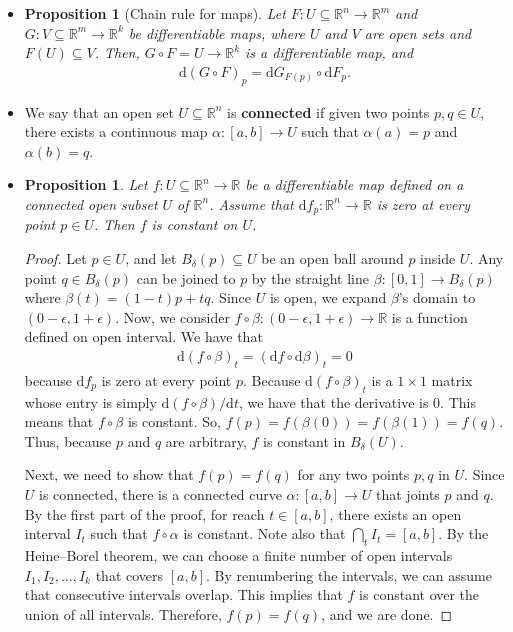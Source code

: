 \documentclass[10pt]{article}
\newtheorem{proposition}[lemma]{Proposition}
\newcommand{\dee}{\mathrm{d}}
\newcommand{\ra}{\rightarrow}
\newcommand{\Real}{\mathbb{R}}
\newcommand{\sseq}{\subseteq}
\begin{document}
\begin{itemize}
    \item \begin{proposition}[Chain rule for maps]
      Let $F: U \sseq \Real^n \ra \Real^m$ and $G : V \sseq \Real^m \ra \Real^k$ be differentiable maps, where $U$ and $V$ are open sets and $F(U) \sseq V$. Then, $G \circ F = U \ra \Real^k$ is a differentiable map, and
      \begin{align*}
        \dee (G \circ F)_p = \dee G_{F(p)} \circ \dee F_p.
      \end{align*}
    \end{proposition}

    \item We say that an open set $U \sseq \Real^n$ is {\bf connected} if given two points $p, q \in U$, there exists a continuous map $\alpha: [a,b] \ra U$ such that $\alpha(a) = p$ and $\alpha(b) = q$.

    \item \begin{proposition}
      Let $f : U \sseq \Real^n \ra \Real$ be a differentiable map defined on a connected open subset $U$ of $\Real^n$. Assume that $\dee f_p: \Real^n \ra \Real$ is zero at every point $p \in U$. Then $f$ is constant on $U$.
    \end{proposition}

    \begin{proof}
      Let $p \in U$, and let $B_\delta(p) \sseq U$ be an open ball around $p$ inside $U$. Any point $q \in B_\delta(p)$ can be joined to $p$ by the straight line $\beta : [0, 1] \ra B_\delta(p)$ where $\beta(t) = (1-t)p + tq$. Since $U$ is open, we expand $\beta$'s domain to $(0-\epsilon, 1+\epsilon)$. Now, we consider $f \circ \beta: (0-\epsilon, 1+\epsilon) \ra \Real$ is a function defined on open interval. We have that
      \begin{align*}
        \dee(f \circ \beta)_t = (\dee f \circ \dee \beta)_t = 0
      \end{align*}
      because $\dee f_p$ is zero at every point $p$. Because $\dee (f \circ \beta)_t$ is a $1 \times 1$ matrix whose entry is simply $\dee (f \circ \beta) / \dee t$, we have that the derivative is $0$. This means that $f \circ \beta$ is constant. So, $f(p) = f(\beta(0)) = f(\beta(1)) = f(q)$. Thus, because $p$ and $q$ are arbitrary, $f$ is constant in $B_\delta(U)$.

      Next, we need to show that $f(p) = f(q)$ for any two points $p, q$ in $U$. Since $U$ is connected, there is a connected curve $\alpha : [a,b] \ra U$ that joints $p$ and $q$. By the first part of the proof, for reach $t \in [a,b]$, there exists an open interval $I_t$ such that $f \circ \alpha$ is constant. Note also that $\bigcap_t I_t = [a,b]$. By the Heine--Borel theorem, we can choose a finite number of open intervals $I_1, I_2, \dotsc, I_k$ that covers $[a,b]$. By renumbering the intervals, we can assume that consecutive intervals overlap. This implies that $f$ is constant over the union of all intervals. Therefore, $f(p) = f(q)$, and we are done.
    \end{proof}


\end{itemize}
\end{document}
